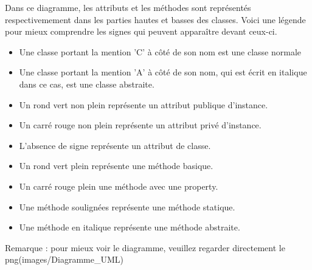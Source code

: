         Dans ce diagramme, les attributs et les méthodes sont représentés respectivemement dans les parties hautes et basses des classes. Voici une légende pour mieux comprendre les signes qui peuvent apparaître devant ceux-ci.
        \bigskip
        \begin{itemize}
            \item Une classe portant la mention 'C' à côté de son nom est une classe normale
            \item Une classe portant la mention 'A' à côté de son nom, qui est écrit en italique dans ce cas, est une classe abstraite.
            \item Un rond vert non plein représente un attribut publique d'instance.
            \item Un carré rouge non plein représente un attribut privé d'instance.
            \item L'absence de signe représente un attribut de classe.
            \item Un rond vert plein représente une méthode basique.
            \item Un carré rouge plein une méthode avec une property.
            \item Une méthode soulignées représente une méthode statique.
            \item Une méthode en italique représente une méthode abstraite.

            
        
        \end{itemize}
        Remarque : pour mieux voir le diagramme, veuillez regarder directement le png(images/Diagramme\_UML)
